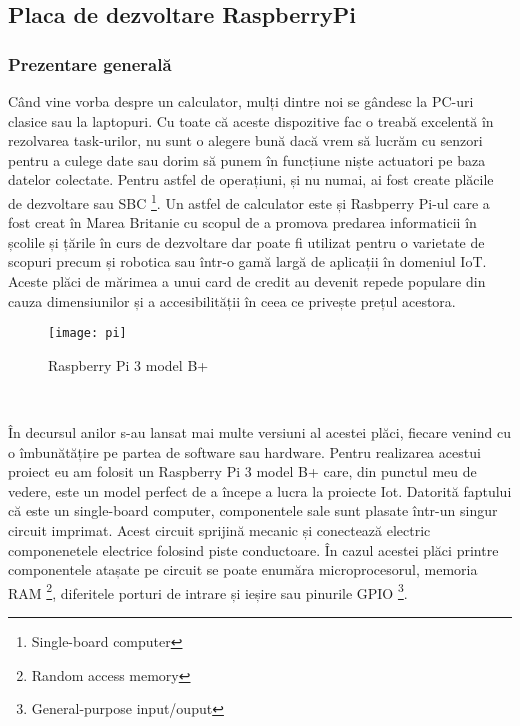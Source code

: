 \documentclass[../IoMusT.tex]{subfiles}
\begin{document}
\subsection{Placa de dezvoltare RaspberryPi}
\subsubsection{Prezentare generală}
Când vine vorba despre un calculator, mulți dintre noi se gândesc la PC-uri clasice sau la laptopuri. Cu toate că aceste dispozitive fac o treabă excelentă în rezolvarea task-urilor, nu sunt o alegere bună dacă vrem să lucrăm cu senzori pentru a culege date sau dorim să punem în funcțiune niște actuatori pe baza datelor colectate. Pentru astfel de operațiuni, și nu numai, ai fost create plăcile de dezvoltare sau SBC \footnote{Single-board computer}. Un astfel de calculator este și Rasbperry Pi-ul care a fost creat în Marea Britanie cu scopul de a promova predarea informaticii în școlile și țările în curs de dezvoltare \cite{SBC} dar poate fi utilizat pentru o varietate de scopuri precum și robotica sau într-o gamă largă de aplicații în domeniul IoT. Aceste plăci de mărimea a unui card de credit au devenit repede populare din cauza dimensiunilor și a accesibilității în ceea ce privește prețul acestora. 
\begin{figure}[h]
\centering
\texttt{[image: pi]}
\caption{Raspberry Pi 3 model B+}
\end{figure}
\\
\par În decursul anilor s-au lansat mai multe versiuni al acestei plăci, fiecare venind cu o îmbunătățire pe partea de software sau hardware. Pentru realizarea acestui proiect eu am folosit un Raspberry Pi 3 model B+ care, din punctul meu de vedere, este un model perfect de a începe a lucra la proiecte Iot. Datorită faptului că este un single-board computer, componentele sale sunt plasate într-un singur circuit imprimat. Acest circuit sprijină mecanic și conectează electric componenetele electrice folosind piste conductoare. În cazul acestei plăci printre componentele atașate pe circuit se poate enumăra microprocesorul, memoria RAM \footnote{Random access memory}, diferitele porturi de intrare și ieșire sau pinurile GPIO \footnote{General-purpose input/ouput}.
\\
\par
\end{document}
